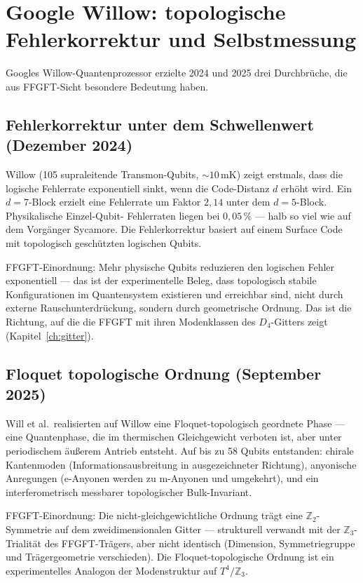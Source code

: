 \section{Google Willow: topologische Fehlerkorrektur und Selbstmessung}

Googles Willow-Quantenprozessor erzielte 2024 und 2025 drei Durchbrüche,
die aus FFGFT-Sicht besondere Bedeutung haben.

\subsection*{Fehlerkorrektur unter dem Schwellenwert (Dezember 2024)}

Willow (105 supraleitende Transmon-Qubits, $\sim10$\,mK) zeigt erstmals,
dass die logische Fehlerrate exponentiell sinkt, wenn die Code-Distanz
$d$ erhöht wird. Ein $d = 7$-Block erzielt eine Fehlerrate um
Faktor $2{,}14$ unter dem $d = 5$-Block. Physikalische Einzel-Qubit-
Fehlerraten liegen bei $0{,}05\,\%$ --- halb so viel wie auf dem
Vorgänger Sycamore. Die Fehlerkorrektur basiert auf einem Surface Code
mit topologisch geschützten logischen Qubits.

FFGFT-Einordnung: Mehr physische Qubits reduzieren den logischen Fehler
exponentiell --- das ist der experimentelle Beleg, dass topologisch stabile
Konfigurationen im Quantensystem existieren und erreichbar sind, nicht
durch externe Rauschunterdrückung, sondern durch geometrische Ordnung.
Das ist die Richtung, auf die die FFGFT mit ihren Modenklassen des
$D_4$-Gitters zeigt (Kapitel~\ref{ch:gitter}).

\subsection*{Floquet topologische Ordnung (September 2025)}

Will et al.\ realisierten auf Willow eine Floquet-topologisch geordnete
Phase --- eine Quantenphase, die im thermischen Gleichgewicht verboten
ist, aber unter periodischem äußerem Antrieb entsteht. Auf bis
zu 58 Qubits entstanden: chirale Kantenmoden (Informationsausbreitung in
ausgezeichneter Richtung), anyonische Anregungen (e-Anyonen werden zu
m-Anyonen und umgekehrt), und ein interferometrisch messbarer
topologischer Bulk-Invariant.

FFGFT-Einordnung: Die nicht-gleichgewichtliche Ordnung trägt eine
$\mathbb{Z}_2$-Symmetrie auf dem zweidimensionalen Gitter --- strukturell
verwandt mit der $\mathbb{Z}_3$-Trialität des FFGFT-Trägers, aber nicht
identisch (Dimension, Symmetriegruppe und Trägergeometrie verschieden).
Die Floquet-topologische Ordnung ist ein experimentelles Analogon der
Modenstruktur auf $T^4/\mathbb{Z}_3$.

